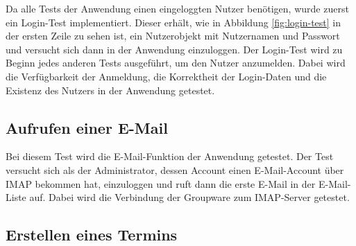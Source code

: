 Da alle Tests der Anwendung einen eingeloggten Nutzer benötigen, wurde zuerst ein Login-Test implementiert. Dieser erhält, wie in Abbildung \ref{fig:login-test} in der ersten Zeile zu sehen ist, ein Nutzerobjekt mit Nutzernamen und Passwort und versucht sich dann in der Anwendung einzuloggen.
Der Login-Test wird zu Beginn jedes anderen Tests ausgeführt, um den Nutzer anzumelden.
Dabei wird die Verfügbarkeit der Anmeldung, die Korrektheit der Login-Daten und die Existenz des Nutzers in der Anwendung getestet.

\subsection*{Aufrufen einer E-Mail}

Bei diesem Test wird die E-Mail-Funktion der Anwendung getestet.
Der Test versucht sich als der Administrator, dessen Account einen E-Mail-Account über IMAP bekommen hat, einzuloggen und ruft dann die erste E-Mail in der E-Mail-Liste auf.
Dabei wird die Verbindung der Groupware zum IMAP-Server getestet.

\subsection*{Erstellen eines Termins}

